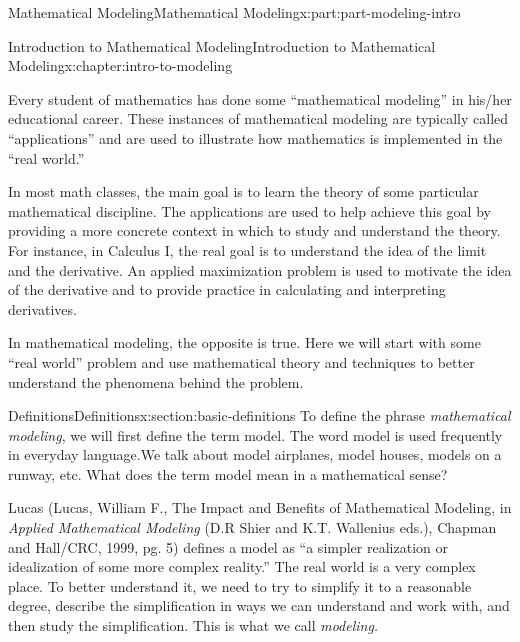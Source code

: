 \documentclass[oneside,10pt,]{book}
\numberwithin{equation}{section}
\begin{document}
\begin{partptx}{Mathematical Modeling}{}{Mathematical Modeling}{}{}{x:part:part-modeling-intro}
%
\typeout{************************************************}
\typeout{************************************************}
%
\begin{chapterptx}{Introduction to Mathematical Modeling}{}{Introduction to Mathematical Modeling}{}{}{x:chapter:intro-to-modeling}
\begin{introduction}{}%
Every student of mathematics has done some “mathematical modeling” in his\slash{}her educational career. These instances of mathematical modeling are typically called “applications” and are used to illustrate how mathematics is implemented in the “real world.”%
\par
In most math classes, the main goal is to learn the theory of some particular mathematical discipline. The applications are used to help achieve this goal by providing a more concrete context in which to study and understand the theory. For instance, in Calculus I, the real goal is to understand the idea of the limit and the derivative. An applied maximization problem is used to motivate the idea of the derivative and to provide practice in calculating and interpreting derivatives.%
\par
In mathematical modeling, the opposite is true. Here we will start with some “real world” problem and use mathematical theory and techniques to better understand the phenomena behind the problem.%
\end{introduction}%
%
%
\typeout{************************************************}
\typeout{************************************************}
%
\begin{sectionptx}{Definitions}{}{Definitions}{}{}{x:section:basic-definitions}
To define the phrase \emph{mathematical modeling}, we will first define the term model. The word model is used frequently in everyday language.We talk about model airplanes, model houses, models on a runway, etc. What does the term model mean in a mathematical sense?%
\par
Lucas (Lucas, William F., The Impact and Benefits of Mathematical Modeling, in \emph{Applied Mathematical Modeling} (D.R Shier and K.T. Wallenius eds.), Chapman and Hall\slash{}CRC, 1999, pg. 5) defines a model as “a simpler realization or idealization of some more complex reality.” The real world is a very complex place. To better understand it, we need to try to simplify it to a reasonable degree, describe the simplification in ways we can understand and work with, and then study the simplification. This is what we call \emph{modeling.}%

\end{sectionptx}
\end{chapterptx}
\end{partptx}
\end{document}
